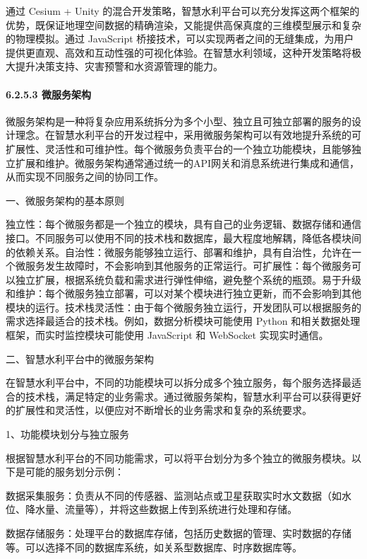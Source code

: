通过 Cesium + Unity 的混合开发策略，智慧水利平台可以充分发挥这两个框架的优势，既保证地理空间数据的精确渲染，又能提供高保真度的三维模型展示和复杂的物理模拟。通过 JavaScript 桥接技术，可以实现两者之间的无缝集成，为用户提供更直观、高效和互动性强的可视化体验。在智慧水利领域，这种开发策略将极大提升决策支持、灾害预警和水资源管理的能力。

\paragraph{6.2.5.3 微服务架构}\label{ux5faeux670dux52a1ux67b6ux6784}

微服务架构是一种将复杂应用系统拆分为多个小型、独立且可独立部署的服务的设计理念。在智慧水利平台的开发过程中，采用微服务架构可以有效地提升系统的可扩展性、灵活性和可维护性。每个微服务负责平台的一个独立功能模块，且能够独立扩展和维护。微服务架构通常通过统一的API网关和消息系统进行集成和通信，从而实现不同服务之间的协同工作。

一、微服务架构的基本原则

独立性：每个微服务都是一个独立的模块，具有自己的业务逻辑、数据存储和通信接口。不同服务可以使用不同的技术栈和数据库，最大程度地解耦，降低各模块间的依赖关系。自治性：微服务能够独立运行、部署和维护，具有自治性，允许在一个微服务发生故障时，不会影响到其他服务的正常运行。可扩展性：每个微服务可以独立扩展，根据系统负载和需求进行弹性伸缩，避免整个系统的瓶颈。易于升级和维护：每个微服务独立部署，可以对某个模块进行独立更新，而不会影响到其他模块的运行。技术栈灵活性：由于每个微服务独立运行，开发团队可以根据服务的需求选择最适合的技术栈。例如，数据分析模块可能使用 Python 和相关数据处理框架，而实时监控模块可能使用 JavaScript 和 WebSocket 实现实时通信。

二、智慧水利平台中的微服务架构

在智慧水利平台中，不同的功能模块可以拆分成多个独立服务，每个服务选择最适合的技术栈，满足特定的业务需求。通过微服务架构，智慧水利平台可以获得更好的扩展性和灵活性，以便应对不断增长的业务需求和复杂的系统要求。

1、功能模块划分与独立服务

根据智慧水利平台的不同功能需求，可以将平台划分为多个独立的微服务模块。以下是可能的服务划分示例：

数据采集服务：负责从不同的传感器、监测站点或卫星获取实时水文数据（如水位、降水量、流量等），并将这些数据上传到系统进行处理和存储。

数据存储服务：处理平台的数据库存储，包括历史数据的管理、实时数据的存储等。可以选择不同的数据库系统，如关系型数据库、时序数据库等。

